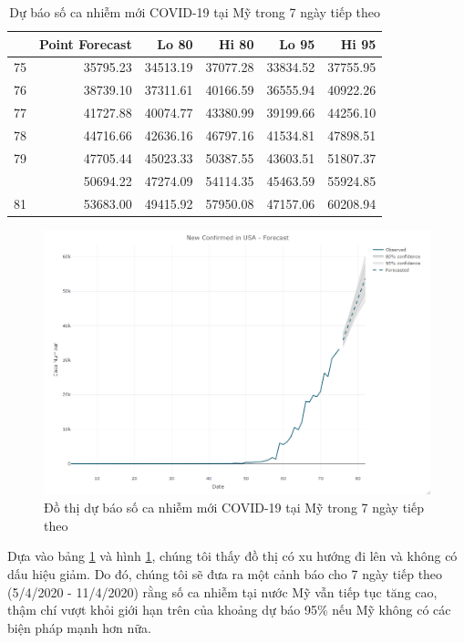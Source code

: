 \documentclass[12pt, a4paper,oneside]{book}
\theoremstyle{definition}
\begin{document}
\begin{table}[!h]	
	\caption{Dự báo số ca nhiễm mới COVID-19 tại Mỹ trong 7 ngày tiếp theo}
    \label{b30}
	\centering
	\fontsize{6}{8}\selectfont
	\begin{tabular}[t]{lrrrrr}
		\toprule
		& Point Forecast & Lo 80 & Hi 80 & Lo 95 & Hi 95\\
		\midrule
		\rowcolor{gray!6}  75 & 35795.23 & 34513.19 & 37077.28 & 33834.52 & 37755.95\\
		76 & 38739.10 & 37311.61 & 40166.59 & 36555.94 & 40922.26\\
		\rowcolor{gray!6}  77 & 41727.88 & 40074.77 & 43380.99 & 39199.66 & 44256.10\\
		78 & 44716.66 & 42636.16 & 46797.16 & 41534.81 & 47898.51\\
		\rowcolor{gray!6}  79 & 47705.44 & 45023.33 & 50387.55 & 43603.51 & 51807.37\\
		\addlinespace
		80 & 50694.22 & 47274.09 & 54114.35 & 45463.59 & 55924.85\\
		\rowcolor{gray!6}  81 & 53683.00 & 49415.92 & 57950.08 & 47157.06 & 60208.94\\
		\bottomrule
	\end{tabular}
\end{table}
\begin{figure}[!htb]
	\centering
	\includegraphics[width=1\linewidth, height=7.7cm]{anh/A7}
	\vskip-4mm 
	\caption{Đồ thị dự báo số ca nhiễm mới COVID-19 tại Mỹ trong 7 ngày tiếp theo}  
	\label{hu1}
\end{figure}
Dựa vào bảng \ref{b30} và hình \ref{hu1}, chúng tôi thấy đồ thị có xu hướng đi lên và không có dấu hiệu giảm. Do đó, chúng tôi sẽ đưa ra một cảnh báo cho 7 ngày tiếp theo (5/4/2020 - 11/4/2020) rằng số ca nhiễm tại nước Mỹ vẫn tiếp tục tăng cao, thậm chí vượt khỏi giới hạn trên của khoảng dự báo 95\% nếu Mỹ không có các biện pháp mạnh hơn nữa.\\
\end{document}
